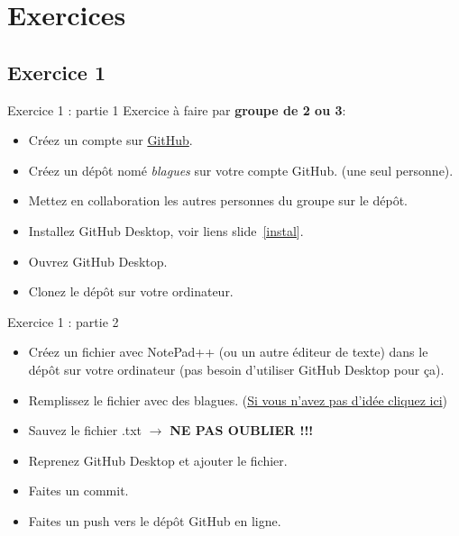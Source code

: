 \documentclass{beamer}
\begin{document}
\section{Exercices}
\subsection{Exercice 1}
\begin{frame}{Exercice 1 : partie 1}
Exercice à faire par \textbf{groupe de 2 ou 3}:
    \begin{itemize}
        \item Créez un compte sur \href{https://github.com}{GitHub}.
        \item Créez un dépôt nomé \textit{blagues} sur votre compte GitHub. (une seul personne).
        \item Mettez en collaboration les autres personnes du groupe sur le dépôt.
        \item Installez GitHub Desktop, voir liens slide~\ref{instal}.
        \item Ouvrez GitHub Desktop.
        \item Clonez le dépôt sur votre ordinateur.
    \end{itemize}
\end{frame}

\begin{frame}{Exercice 1 : partie 2}
    \begin{itemize}
        \item Créez un fichier avec NotePad++ (ou un autre éditeur de texte)
            dans le dépôt sur votre ordinateur (pas besoin d'utiliser
            GitHub Desktop pour ça).
        \item Remplissez le fichier avec des blagues.
            (\href{https://linuxfr.org/news/blagues-d-informaticiens}{Si vous
            n'avez pas d'idée cliquez ici})
        \item Sauvez le fichier .txt $\rightarrow$ \textbf{NE PAS OUBLIER !!!}
        \item Reprenez GitHub Desktop et ajouter le fichier.
        \item Faites un commit.
        \item Faites un push vers le dépôt GitHub en ligne.
    \end{itemize}
\end{frame}
\end{document}
